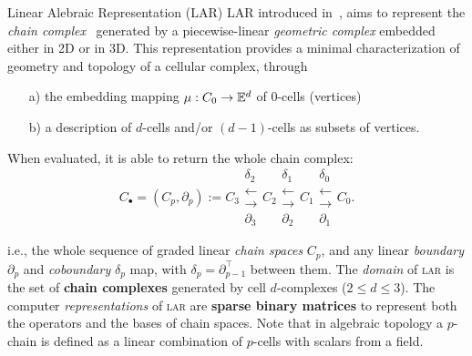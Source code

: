 \documentclass[10pt]{beamer}
\begin{document}
\begin{frame}{Linear Alebraic Representation (LAR)}
LAR introduced in~\cite{Dicarlo:2014:TNL:2543138.2543294}, aims to represent the \emph{chain complex}~\cite{DiCarlo2009,TSAS} generated by a piecewise-linear \emph{geometric complex} embedded either in 2D or in 3D. 
This representation provides a minimal characterization of geometry and topology of a cellular complex, through 
\begin{enumerate}
    \item[a)] the embedding mapping 
        $\mu : C_0 \to \mathbb{E}^d$ of 0-cells (vertices)
    \item[b)] a description of $d$-cells and/or $(d-1)$-cells as subsets of vertices. 
\end{enumerate}


When evaluated, it is able to return the whole chain complex:
\begin{equation}
C_\bullet = (C_p, \partial_p) := 
C_3 
\substack{
\delta_2 \\
\longleftarrow \\
\longrightarrow \\
\partial_3 
}
C_2 
\substack{
\delta_1 \\
\longleftarrow \\
\longrightarrow \\
\partial_2 
}
C_1  
\substack{
\delta_0 \\
\longleftarrow  \\
\longrightarrow \\
\partial_1 
}
C_0 .
\end{equation}


i.e., the whole sequence of graded linear \emph{chain spaces} $C_p$, and any linear \emph{boundary} $\partial_p$ and \emph{coboundary} $\delta_p$ map, with $\delta_p=\partial_{p-1}^\top$ between them.
 The \emph{domain} of \textsc{lar} is the set of \textbf{chain complexes} generated by cell $d$-complexes ($2\leq d\leq 3$). The computer \emph{representations} of \textsc{lar} are \textbf{sparse binary matrices} to represent both the operators and the bases of chain spaces. Note that in algebraic topology a $p$-chain is defined as a linear combination of $p$-cells with scalars from a field. 
 

    
\end{frame}
\end{document}
